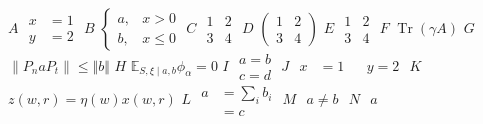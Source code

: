 \documentclass{article}
\begin{document}
$A$ $\begin{aligned} x&=1\\ y&=2\end{aligned}$
$B$ $\begin{cases} a,&x>0\\ b,&x\le0\end{cases}$
$C$ $\begin{array}{cc}1&2\\3&4\end{array}$
$D$ $\begin{pmatrix}1&2\\3&4\end{pmatrix}$
$E$ $\begin{smallmatrix}1&2\\3&4\end{smallmatrix}$
$F$ $\operatorname{Tr}(\gamma A)$
$G$ $\lVert P_n a P_t\rVert \le \Vert b\Vert$
$H$ $\mathbb E_{S,\xi\mid a,b}\phi_\alpha=0$
$I$ $\begin{gather} a=b\\ c=d\end{gather}$
$J$ $\begin{alignedat}{2} x&=1&&y=2\end{alignedat}$
$K$ $z(w,r)={}\eta(w)x(w,r)$
$L$ $\begin{aligned} a&=\sum_{i} b_i \\&= c\end{aligned}$
$M$ $\begin{aligned} a \ne b\end{aligned}$
$N$ $\begin{aligned} a \end{aligned}$
\end{document}
